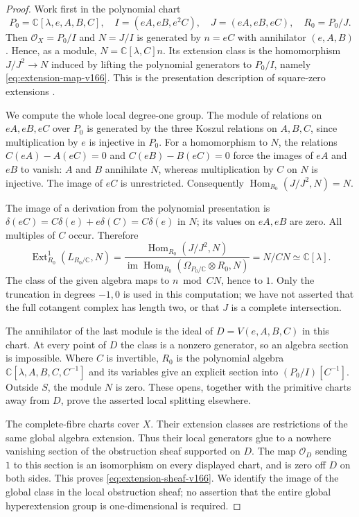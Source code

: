 \documentclass[11pt,reqno]{amsart}
\numberwithin{equation}{section}
\theoremstyle{definition}\newtheorem{definition}[theorem]{Definition}
\theoremstyle{remark}\newtheorem{remark}[theorem]{Remark}
\newcommand{\C}{\mathbb C}\newcommand{\Q}{\mathbb Q}
\newcommand{\OO}{\mathcal O}\newcommand{\II}{\mathcal I}
\begin{document}
\begin{proof}
Work first in the polynomial chart
\[
 P_0=\C[\lambda,e,A,B,C],\quad
 I=(eA,eB,e^2C),\quad J=(eA,eB,eC),\quad R_0=P_0/J.
\]
Then $\OO_X=P_0/I$ and $N=J/I$ is generated by $n=eC$ with
annihilator $(e,A,B)$. Hence, as a module,
$N=\C[\lambda,C]n$. Its extension class is the homomorphism
$J/J^2\to N$ induced by lifting the polynomial generators to
$P_0/I$, namely \eqref{eq:extension-map-v166}. This is the
presentation description of square-zero extensions
\cite[Section 91.2, especially Lemma 91.2.3 and Remark 91.2.4]{Stacks166}.

We compute the whole local degree-one group. The module of relations
on $eA,eB,eC$ over $P_0$ is generated by the three Koszul relations
on $A,B,C$, since multiplication by $e$ is injective in $P_0$.
For a homomorphism to $N$, the relations
$C(eA)-A(eC)=0$ and $C(eB)-B(eC)=0$ force the images of $eA$ and
$eB$ to vanish: $A$ and $B$ annihilate $N$, whereas multiplication
by $C$ on $N$ is injective. The image of $eC$ is unrestricted.
Consequently $\operatorname{Hom}_{R_0}(J/J^2,N)=N$.

The image of a derivation from the polynomial presentation is
$\delta(eC)=C\delta(e)+e\delta(C)=C\delta(e)$ in $N$; its values
on $eA,eB$ are zero. All multiples of $C$ occur. Therefore
\begin{equation}\label{eq:local-ext-v166}
 \operatorname{Ext}^1_{R_0}(L_{R_0/\C},N)
  =\frac{\operatorname{Hom}_{R_0}(J/J^2,N)}
         {\operatorname{im}\operatorname{Hom}_{R_0}
               (\Omega_{P_0/\C}\otimes R_0,N)}
  =N/CN\simeq\C[\lambda].
\end{equation}
The class of the given algebra maps to $n\bmod CN$, hence to $1$.
Only the truncation in degrees $-1,0$ is used in this computation;
we have not asserted that the full cotangent complex has length
two, or that $J$ is a complete intersection.

The annihilator of the last module is the ideal of
$D=V(e,A,B,C)$ in this chart. At every point of $D$ the class is a
nonzero generator, so an algebra section is impossible. Where
$C$ is invertible, $R_0$ is the polynomial algebra
$\C[\lambda,A,B,C,C^{-1}]$ and its variables give an explicit
section into $(P_0/I)[C^{-1}]$. Outside $S$, the module $N$ is zero.
These opens, together with the primitive charts away from $D$,
prove the asserted local splitting elsewhere.

The complete-fibre charts cover $X$. Their extension classes are
restrictions of the same global algebra extension. Thus their
local generators glue to a nowhere vanishing section of the
obstruction sheaf supported on $D$. The map $\OO_D$ sending $1$
to this section is an isomorphism on every displayed chart, and is
zero off $D$ on both sides. This proves
\eqref{eq:extension-sheaf-v166}. We identify the image of the global
class in the local obstruction sheaf; no assertion that the entire
global hyperextension group is one-dimensional is required.
\end{proof}
\end{document}
